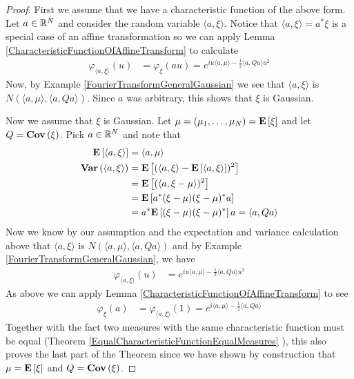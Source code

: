 \begin{proof}
First we assume that we have a characteristic function of the above
form.  Let $a \in \mathbb{R}^N$ and consider the random variable $\langle
a, \xi \rangle$.  Notice that $\langle a, \xi \rangle = a^* \xi$ is a
special case of an affine transformation so we
can apply Lemma
\ref{CharacteristicFunctionOfAffineTransform} to calculate
\begin{align*}
\varphi_{\langle a, \xi \rangle}(u) &= \varphi_\xi(a u) = e^{i u \langle
  a, \mu\rangle - \frac{1}{2}\langle a, Q a\rangle u^2} 
\end{align*}
Now, by Example \ref{FourierTransformGeneralGaussian}
we see that $\langle a, \xi \rangle$ is $N(\langle
  a, \mu\rangle, \langle a, Q a\rangle)$.  Since $a$ was arbitrary,
  this shows that $\xi$ is Gaussian.

Now we assume that $\xi$ is Gaussian.  Let $\mu = (\mu_1, \dots,
\mu_N) = \textbf{E}\left[\xi\right]$ and let $Q = \textbf{Cov} \left (\xi \right )$.  Pick $a
\in \mathbb{R}^N$ and note that 
\begin{align*}
\textbf{E}\left[\langle a,\xi \rangle\right] &= \langle a, \mu \rangle \\
\textbf{Var} \left (\langle a,\xi \rangle \right ) &= \textbf{E}\left[(\langle a,\xi
  \rangle - \textbf{E}\left[\langle a,\xi \rangle\right])^2\right] \\
&=  \textbf{E}\left[(\langle a,\xi - \mu  \rangle)^2\right] \\
&=  \textbf{E}\left[a^* (\xi - \mu) (\xi - \mu)^* a\right] \\
&= a^*\textbf{E}\left[ (\xi - \mu) (\xi - \mu)^*\right]a = \langle a, Q a
\rangle \\
\end{align*}
Now we know by our assumption and the expectation and variance
calculation above  that $\langle a, \xi \rangle$ is
$N(\langle a, \mu \rangle, \langle a, Q a \rangle)$ and by Example
\ref{FourierTransformGeneralGaussian}, we have
\begin{align*}
\varphi_{\langle a, \xi \rangle}(u) &= e^{iu \langle a, \mu \rangle -
  \frac{1}{2}\langle a, Q a \rangle u^2}
\end{align*}
As above we can apply Lemma
\ref{CharacteristicFunctionOfAffineTransform}
to see
\begin{align*}
\varphi_\xi(a) &= \varphi_{\langle a, \xi \rangle}(1) =  e^{i \langle a, \mu \rangle -  \frac{1}{2}\langle a, Q a \rangle}
\end{align*}
Together with the fact two measures with the same characteristic
function must be equal (Theorem
\ref{EqualCharacteristicFunctionEqualMeasures} ), this also proves the last part of the Theorem since we have shown by
construction that $\mu = \textbf{E}\left[\xi\right]$ and $Q = \textbf{Cov} \left (\xi \right )$.
\end{proof}

